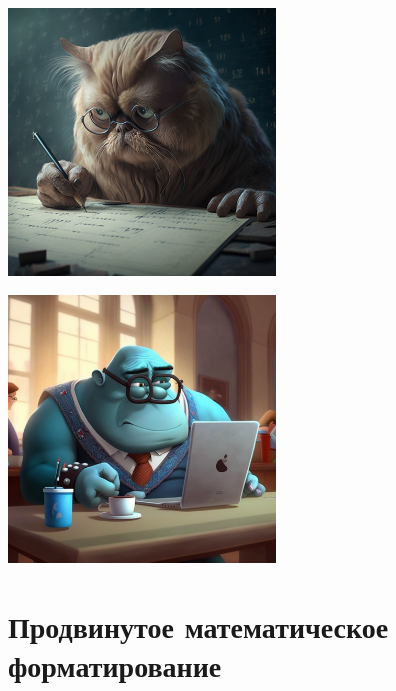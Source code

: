 \documentclass[a4paper,12pt]{article}
\begin{document}
\begin{minipage}[t][][t]{0.2\linewidth}
\vspace{3ex}
\begin{center}
\includegraphics[width=71mm]{img/GlebChili_A_sad_cat_trying_to_write_mathematical_text_in_LaTeX._8451f32e-91ec-4e9b-a756-9101632af4a9.png}
\addtocounter{figure}{-1}
\end{center}
\end{minipage}\hfill
\begin{minipage}[t][][t]{0.2\linewidth}
\vspace{3ex}
\begin{center}
\includegraphics[width=71mm]{img/GlebChili_Math_professor_checking_emails_from_students._In_styl_e02f6eff-3592-4212-9325-83b12cee4755.png}
\addtocounter{figure}{-1}
\end{center}
\end{minipage}\hfill
\captionsetup{labelformat=default}

\section{Продвинутое математическое форматирование}
\end{document}
